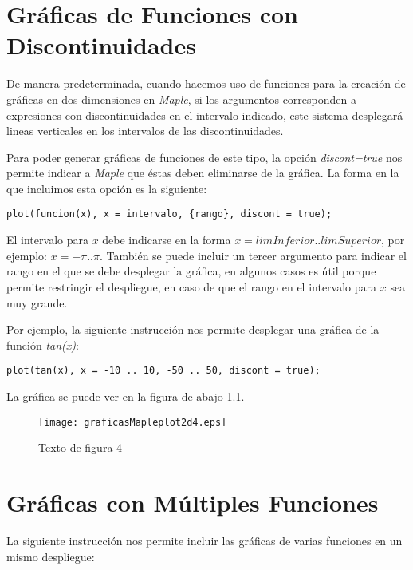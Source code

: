 \documentclass[letterpaper,12pt]{book}
\begin{document}
\chapter{Gráficas de Funciones con Discontinuidades}

\thispagestyle{empty}

De manera predeterminada, cuando hacemos uso de funciones para la creación de gráficas en 
dos dimensiones en \emph{Maple}, si los argumentos corresponden a expresiones con 
discontinuidades en el intervalo indicado, este sistema desplegará lineas verticales en
los intervalos de las discontinuidades.

Para poder generar gráficas de funciones de este tipo, la opción
\emph{discont=true} nos permite indicar a \emph{Maple} que éstas deben eliminarse de la
gráfica. La forma en la que incluimos esta opción es la siguiente:

\begin{verbatim}
plot(funcion(x), x = intervalo, {rango}, discont = true);
\end{verbatim}

El intervalo para $x$ debe indicarse en la forma $x=limInferior..limSuperior$, por ejemplo:
$x=-\pi..\pi$. También se puede incluir un tercer argumento para indicar el rango en el que
se debe desplegar la gráfica, en algunos casos es útil porque permite restringir el despliegue,
en caso de que el rango en el intervalo para $x$ sea muy grande.

Por ejemplo, la siguiente instrucción nos permite desplegar una gráfica de la función \emph{tan(x)}:

\begin{verbatim}
plot(tan(x), x = -10 .. 10, -50 .. 50, discont = true);
\end{verbatim}

La gráfica se puede ver en la figura de abajo \ref{cap2f1}.

\begin{figure}[h!]
\centering
\texttt{[image: graficasMapleplot2d4.eps]}
\caption{Texto de figura 4}\label{cap2f1}
\end{figure}

\chapter{Gráficas con Múltiples Funciones}

\thispagestyle{empty}

La siguiente instrucción nos permite incluir las gráficas de varias funciones en un mismo despliegue:
\end{document}
